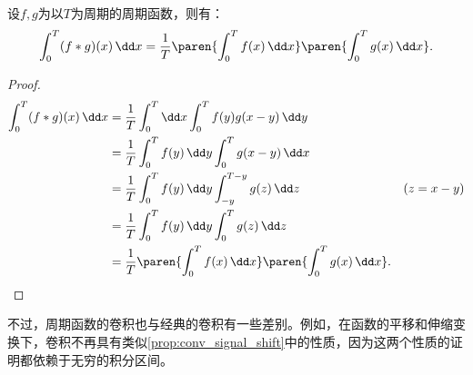 \begin{proposition}[“面积”关系]
    设$f,g$为以$T$为周期的周期函数，则有：
    \begin{equation}
        \int_0^{T}(f*g)(x)\,\dd x=\frac{1}{T}\paren{\int_0^{T}f(x)\,\dd x}\paren{\int_0^{T}g(x)\,\dd x}.
    \end{equation}
\end{proposition}
\begin{proof}
    \begin{align}
        \int_0^{T}(f*g)(x)\,\dd x&=\frac{1}{T}\int_0^{T}\dd x\int_0^{T}f(y)g(x-y)\,\dd y\nonumber\\
        &=\frac{1}{T}\int_0^{T}f(y)\,\dd y\int_0^{T}g(x-y)\,\dd x\nonumber\\
        &=\frac{1}{T}\int_0^{T}f(y)\,\dd y\int_{-y}^{T-y}g(z)\,\dd z&(z=x-y)\nonumber\\
        &=\frac{1}{T}\int_0^{T}f(y)\,\dd y\int_0^{T}g(z)\,\dd z\nonumber\\
        &=\frac{1}{T}\paren{\int_0^{T}f(x)\,\dd x}\paren{\int_0^{T}g(x)\,\dd x}.
    \end{align}
\end{proof}

不过，周期函数的卷积也与经典的卷积有一些差别。例如，在函数的平移和伸缩变换下，卷积不再具有类似\cref{prop:conv_signal_shift}中的性质，因为这两个性质的证明都依赖于无穷的积分区间。

